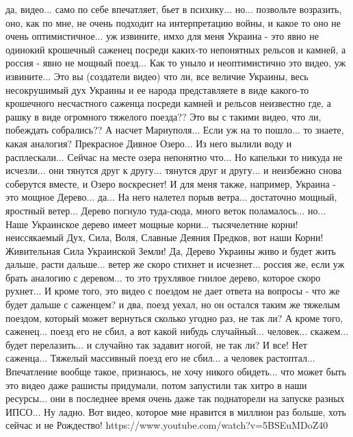 да, видео... само по себе впечатляет, бьет в психику... но... позвольте
возразить, оно, как по мне, не очень подходит на интерпретацию войны, и какое
то оно не очень оптимистичное... уж извините, имхо для меня Украина - это явно
не одинокий крошечный саженец посреди каких-то непонятных рельсов и камней, а
россия - явно не мощный поезд... Как то уныло и неоптимистично это видео, уж
извините... Это вы (создатели видео) что ли, все величие Украины, весь
несокрушимый дух Украины и ее народа представляете в виде какого-то крошечного
несчастного саженца посреди камней и рельсов неизвестно где, а рашку в виде
огромного тяжелого поезда?? Это вы с такими видео, что ли, побеждать
собрались?? А насчет Мариуполя... Если уж на то пошло... то знаете, какая
аналогия? Прекрасное Дивное Озеро... Из него вылили воду и расплескали...
Сейчас на месте озера непонятно что... Но капельки то никуда не исчезли... они
тянутся друг к другу... тянутся друг и другу... и неизбежно снова соберутся
вместе, и Озеро воскреснет! И для меня также, например, Украина - это мощное
Дерево... да... На него налетел порыв ветра... достаточно мощный, яростный
ветер... Дерево погнуло туда-сюда, много веток поламалось... но... Наше
Украинское дерево имеет мощные корни... тысячелетние корни! неиссякаемый Дух,
Сила, Воля, Славные Деяния Предков, вот наши Корни! Живительная Сила Украинской
Земли! Да, Дерево Украины живо и будет жить дальше, расти дальше... ветер же
скоро стихнет и исчезнет... россия же, если уж брать аналогию с деревом... то
это трухлявое гнилое дерево, которое скоро рухнет... И кроме того, это видео с
поездом не дает ответа на вопросы - что же будет дальше с саженцем? и два,
поезд уехал, но он остался таким же тяжелым поездом, который может вернуться
сколько угодно раз, не так ли? А кроме того, саженец... поезд его не сбил, а
вот какой нибудь случайный... человек... скажем... будет перелазить... и
случайно так задавит ногой, не так ли? И все! Нет саженца... Тяжелый массивный
поезд его не сбил... а человек растоптал...  Впечатление вообще такое,
признаюсь, не хочу никого обидеть... что может быть это видео даже рашисты
придумали, потом запустили так хитро в наши ресурсы... они в последнее время
очень даже так поднаторели на запуске разных ИПСО... Ну ладно. Вот видео,
которое мне нравится в миллион раз больше, хоть сейчас и не Рождество!
https://www.youtube.com/watch?v=5BSEuMDoZ40

